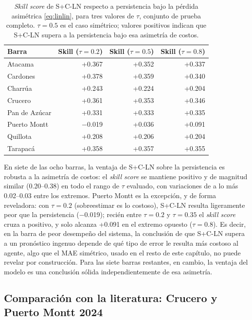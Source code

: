 \begin{table}[htbp]
    \centering
    \begin{tabular}{lrrr}
        \toprule
        Barra & Skill ($\tau=0.2$) & Skill ($\tau=0.5$) & Skill ($\tau=0.8$) \\
        \midrule
        Atacama        & +0.367 & +0.352 & +0.337 \\
        Cardones       & +0.378 & +0.359 & +0.340 \\
        Charrúa        & +0.243 & +0.224 & +0.204 \\
        Crucero        & +0.361 & +0.353 & +0.346 \\
        Pan de Azúcar  & +0.331 & +0.333 & +0.335 \\
        Puerto Montt   & $-$0.019 & +0.036 & +0.091 \\
        Quillota       & +0.208 & +0.206 & +0.204 \\
        Tarapacá       & +0.358 & +0.357 & +0.355 \\
        \bottomrule
    \end{tabular}
    \caption{\textit{Skill score} de S+C-LN respecto a persistencia bajo la pérdida asimétrica \eqref{eq:linlin}, para tres valores de $\tau$, conjunto de prueba completo. $\tau=0.5$ es el caso simétrico; valores positivos indican que S+C-LN supera a la persistencia bajo esa asimetría de costos.}
    \label{tab:perdida_asimetrica}
\end{table}

En siete de las ocho barras, la ventaja de S+C-LN sobre la persistencia es robusta a la asimetría de costos: el \textit{skill score} se mantiene positivo y de magnitud similar (0.20--0.38) en todo el rango de $\tau$ evaluado, con variaciones de a lo más 0.02--0.03 entre los extremos. Puerto Montt es la excepción, y de forma reveladora: con $\tau=0.2$ (sobreestimar es lo costoso), S+C-LN resulta ligeramente peor que la persistencia ($-$0.019); recién entre $\tau=0.2$ y $\tau=0.35$ el \textit{skill score} cruza a positivo, y solo alcanza +0.091 en el extremo opuesto ($\tau=0.8$). Es decir, en la barra de peor desempeño del sistema, la conclusión de que S+C-LN supera a un pronóstico ingenuo depende de qué tipo de error le resulta más costoso al agente, algo que el MAE simétrico, usado en el resto de este capítulo, no puede revelar por construcción. Para las siete barras restantes, en cambio, la ventaja del modelo es una conclusión sólida independientemente de esa asimetría.

\subsection{Comparación con la literatura: Crucero y Puerto Montt 2024}
\label{sec:crucero_leon}

